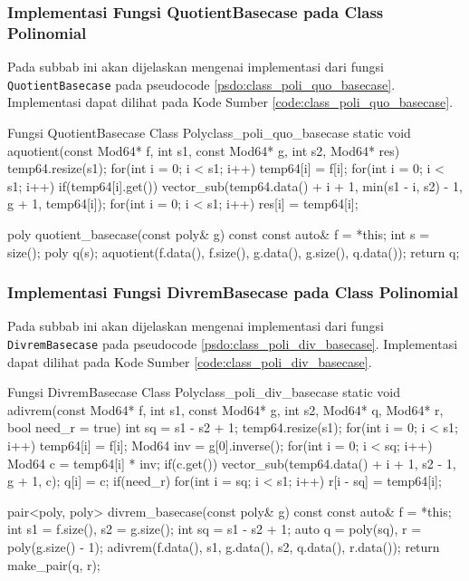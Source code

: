 \subsubsection{Implementasi Fungsi QuotientBasecase pada Class Polinomial}
Pada subbab ini akan dijelaskan mengenai implementasi dari fungsi \texttt{QuotientBasecase} pada pseudocode \ref{psdo:class_poli_quo_basecase}. Implementasi dapat dilihat pada Kode Sumber \ref{code:class_poli_quo_basecase}.


\begin{code}[firstnumber=1]{Fungsi QuotientBasecase Class Poly}{class_poli_quo_basecase}
	static void aquotient(const Mod64* f, int s1, const Mod64* g, int s2, Mod64* res) {
		temp64.resize(s1);
		for(int i = 0; i < s1; i++) temp64[i] = f[i];
		for(int i = 0; i < s1; i++) if(temp64[i].get()) vector_sub(temp64.data() + i + 1, min(s1 - i, s2) - 1, g + 1, temp64[i]);
		for(int i = 0; i < s1; i++) res[i] = temp64[i];
	}
	
	poly quotient_basecase(const poly& g) const {
		const auto& f = *this;
		int s = size();
		poly q(s);
		aquotient(f.data(), f.size(), g.data(), g.size(), q.data());
		return q;
	}
\end{code}

\subsubsection{Implementasi Fungsi DivremBasecase pada Class Polinomial}
Pada subbab ini akan dijelaskan mengenai implementasi dari fungsi \texttt{DivremBasecase} pada pseudocode \ref{psdo:class_poli_div_basecase}. Implementasi dapat dilihat pada Kode Sumber \ref{code:class_poli_div_basecase}.


\begin{code}[firstnumber=1]{Fungsi DivremBasecase Class Poly}{class_poli_div_basecase}
	static void adivrem(const Mod64* f, int s1, const Mod64* g, int s2, Mod64* q, Mod64* r, bool need_r = true) {
		int sq = s1 - s2 + 1;
		temp64.resize(s1);
		for(int i = 0; i < s1; i++) temp64[i] = f[i];
		Mod64 inv = g[0].inverse();
		for(int i = 0; i < sq; i++){
			Mod64 c = temp64[i] * inv;
			if(c.get()) vector_sub(temp64.data() + i + 1, s2 - 1, g + 1, c);
			q[i] = c;
		}
		if(need_r){
			for(int i = sq; i < s1; i++) r[i - sq] = temp64[i];
		}
	}
	
	pair<poly, poly> divrem_basecase(const poly& g) const {
		const auto& f = *this;
		int s1 = f.size(), s2 = g.size();
		int sq = s1 - s2 + 1;
		auto q = poly(sq), r = poly(g.size() - 1);
		adivrem(f.data(), s1, g.data(), s2, q.data(), r.data());
		return make_pair(q, r);
	}
\end{code}


